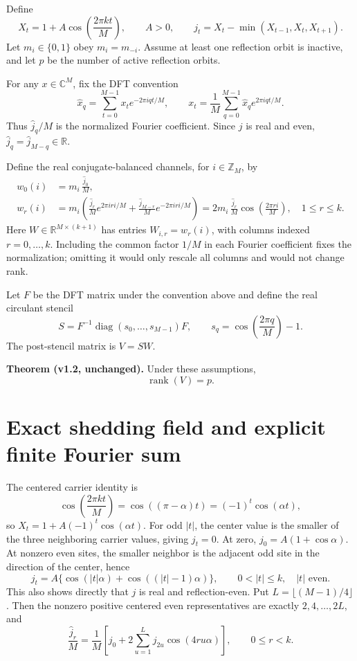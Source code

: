 \documentclass[11pt]{article}
\begin{document}
Define
\[
 X_t=1+A\cos\!\left(\frac{2\pi kt}{M}\right),\qquad A>0,
 \qquad j_t=X_t-\min(X_{t-1},X_t,X_{t+1}).
\]
Let $m_i\in\{0,1\}$ obey $m_i=m_{-i}$. Assume at least one reflection orbit is inactive, and let $p$ be the number of active reflection orbits.

For any $x\in\mathbb C^M$, fix the DFT convention
\[
 \widehat{x}_q=\sum_{t=0}^{M-1}x_t e^{-2\pi iqt/M},\qquad
 x_t=\frac1M\sum_{q=0}^{M-1}\widehat{x}_q e^{2\pi iqt/M}.
\]
Thus $\widehat j_q/M$ is the normalized Fourier coefficient. Since $j$ is real and even, $\widehat j_q=\widehat j_{M-q}\in\mathbb R$.

Define the real conjugate-balanced channels, for $i\in\mathbb Z_M$, by
\begin{align*}
 w_0(i)&=m_i\,\frac{\widehat j_0}{M},\\
 w_r(i)&=m_i\left(\frac{\widehat j_r}{M}e^{2\pi iri/M}
              +\frac{\widehat j_{M-r}}{M}e^{-2\pi iri/M}\right)
       =2m_i\,\frac{\widehat j_r}{M}\cos\!\left(\frac{2\pi ri}{M}\right),
       \quad 1\leq r\leq k.
\end{align*}
Here $W\in\mathbb R^{M\times(k+1)}$ has entries $W_{i,r}=w_r(i)$, with columns indexed $r=0,\ldots,k$. Including the common factor $1/M$ in each Fourier coefficient fixes the normalization; omitting it would only rescale all columns and would not change rank.

Let $F$ be the DFT matrix under the convention above and define the real circulant stencil
\[
 S=F^{-1}\operatorname{diag}(s_0,\ldots,s_{M-1})F,
 \qquad s_q=\cos\!\left(\frac{2\pi q}{M}\right)-1.
\]
The post-stencil matrix is $V=SW$.

\textbf{Theorem (v1.2, unchanged).} Under these assumptions,
\[
 \boxed{\operatorname{rank}(V)=p.}
\]

\section{Exact shedding field and explicit finite Fourier sum}

The centered carrier identity is
\[
 \cos\!\left(\frac{2\pi kt}{M}\right)
 =\cos((\pi-\alpha)t)=(-1)^t\cos(\alpha t),
\]
so $X_t=1+A(-1)^t\cos(\alpha t)$. For odd $|t|$, the center value is the smaller of the three neighboring carrier values, giving $j_t=0$. At zero, $j_0=A(1+\cos\alpha)$. At nonzero even sites, the smaller neighbor is the adjacent odd site in the direction of the center, hence
\[
 j_t=A\{\cos(|t|\alpha)+\cos((|t|-1)\alpha)\},
 \qquad 0<|t|\leq k,\quad |t|\text{ even}.
\]
This also shows directly that $j$ is real and reflection-even. Put $L=\lfloor(M-1)/4\rfloor$. Then the nonzero positive centered even representatives are exactly $2,4,\ldots,2L$, and
\[
 \frac{\widehat j_r}{M}
 =\frac{1}{M}\left[j_0+2\sum_{u=1}^{L}j_{2u}
                  \cos(4ru\alpha)\right],\qquad 0\leq r<k. \tag{1}
\]
\end{document}
